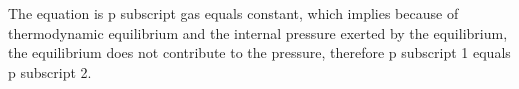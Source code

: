 The equation is p subscript gas equals constant, which implies because of thermodynamic equilibrium and the internal pressure exerted by the equilibrium, the equilibrium does not contribute to the pressure, therefore p subscript 1 equals p subscript 2.